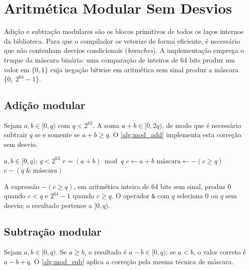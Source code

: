 \documentclass[11pt,a4paper]{report}
\begin{document}
\chapter{Aritmética Modular Sem Desvios}
\label{cap:modular}

Adição e subtração modulares são os blocos primitivos de todos os laços internos da
biblioteca. Para que o compilador os vetorize de forma eficiente, é necessário que não
contenham desvios condicionais (\emph{branches}). A implementação emprega o truque da
máscara binária: uma comparação de inteiros de 64 bits produz um valor em $\{0, 1\}$
cuja negação bitwise em aritmética sem sinal produz a máscara $\{0,\; 2^{64}-1\}$.

\section{Adição modular}
\label{sec:mod_add}

Sejam $a, b \in [0, q)$ com $q < 2^{63}$. A soma $a + b \in [0, 2q)$, de modo que é
necessário subtrair $q$ se e somente se $a + b \geq q$. O \cref{alg:mod_add} implementa
esta correção sem desvio.

\begin{algorithm}[ht]
\caption{\texttt{mod\_add}: adição modular sem desvio condicional}
\label{alg:mod_add}
\begin{algorithmic}[1]
\Require $a, b \in [0, q)$;\; $q < 2^{63}$
\Ensure $r = (a + b) \bmod q$
\State $c \gets a + b$
  \Comment{Sem \emph{overflow}: $c \in [0, 2q) \subset [0, 2^{64})$}
\State $\text{máscara} \gets -(c \geq q)$
\State \Return $c - (q \;\mathbin{\&}\; \text{máscara})$
\end{algorithmic}
\end{algorithm}

A expressão $-(c \geq q)$, em aritmética inteira de 64 bits sem sinal, produz $0$ quando
$c < q$ e $2^{64}-1$ quando $c \geq q$. O operador \texttt{\&} com $q$ seleciona
$0$ ou $q$ sem desvio; o resultado pertence a $[0, q)$.

\section{Subtração modular}
\label{sec:mod_sub}

Sejam $a, b \in [0, q)$. Se $a \geq b$, o resultado é $a - b \in [0, q)$; se $a < b$,
o valor correto é $a - b + q$. O \cref{alg:mod_sub} aplica a correção pela mesma
técnica de máscara.
\end{document}
